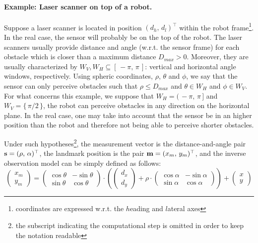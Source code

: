 	\paragraph{Example: Laser scanner on top of a robot.}
		Suppose a laser scanner is located in position $(d_h,\,d_l)^\top$ within the robot frame\footnote{coordinates are expressed w.r.t. the $h$eading and $l$ateral axes}.
		In the real case, the sensor will probably be on the top of the robot.
		The laser scanners usually provide distance and angle (w.r.t. the sensor frame) for each obstacle which is closer than a maximum distance $D_{max} > 0$.
		Moreover, they are usually characterized by $W_{V},W_{H} \subseteq [\,-\pi,\, \pi\,]$: vertical and horizontal angle windows, respectively.
		Using spheric coordinates, $\rho$, $\theta$ and $\phi$, we say that the sensor can only perceive obstacles such that $\rho \leq D_{max}$ and $\theta \in W_{H}$ and $\phi \in W_{V}$.
		For what concerns this example, we suppose that $W_H = (\,-\pi,\, \pi\,]$ and $W_V = \{\, \pi / 2 \,\}$, \ie{} the robot can perceive obstacles in any direction on the horizontal plane.
		In the real case, one may take into account that the sensor be in an higher position than the robot and therefore not being able to perceive shorter obstacles.
		
		Under such hypotheses\footnote{the subscript indicating the computational step is omitted in order to keep the notation readable}, the measurement vector is the distance-and-angle pair $\boldsymbol{\mathrm{{s}}} = (\rho,\, \alpha)^\top$, the landmark position is the pair $\boldsymbol{\mathrm{{m}}} = (x_m,\, y_m)^\top$, and the inverse observation model can be simply defined as follows:
		\begin{equation}
			\label{eq.inv_observation.laser}
			\left(\begin{array}{c}
				x_m \\ y_m
			\end{array}\right)
			=
			\left(\begin{array}{ccc}
				\cos{\theta} & -\sin{\theta} \\
				\sin{\theta} & \cos{\theta}
			\end{array}\right)
			\cdot
			\left(
				\left(\begin{array}{c}
					d_x \\ d_y
				\end{array}\right)
				+ \rho \cdot
				\left(\begin{array}{cc}
					\cos{\alpha} & -\sin{\alpha} \\
					\sin{\alpha} & \cos{\alpha}
				\end{array}\right)
			\right)
			+
			\left(\begin{array}{c}
				x \\ y
			\end{array}\right)
		\end{equation}
		
